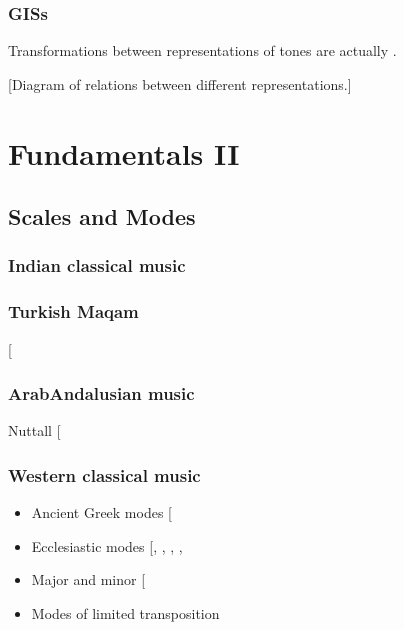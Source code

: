 \documentclass[letterpaper,10pt,english]{sphinxmanual}
\begin{document}
\subsection{GISs}
\label{\detokenize{1_fundamentals:giss}}
Transformations between representations of tones are actually .

{[}Diagram of relations between different representations.{]}


\chapter{Fundamentals II}
\label{\detokenize{1_fundamentals:fundamentals-ii}}

\section{Scales and Modes}
\label{\detokenize{1_fundamentals:scales-and-modes}}

\subsection{Indian classical music}
\label{\detokenize{1_fundamentals:indian-classical-music}}

\subsection{Turkish Maqam}
\label{\detokenize{1_fundamentals:turkish-maqam}}
 {[}\sphinxcite{8_bibliography:id22}{]}


\subsection{Arab\sphinxhyphen{}Andalusian music}
\label{\detokenize{1_fundamentals:arab-andalusian-music}}
Nuttall  {[}\sphinxcite{8_bibliography:id29}{]}


\subsection{Western classical music}
\label{\detokenize{1_fundamentals:western-classical-music}}\begin{itemize}
\item {} 
Ancient Greek modes {[}\sphinxcite{8_bibliography:id21}{]}

\item {} 
Ecclesiastic modes {[}, , , , \sphinxcite{8_bibliography:id23}{]}

\item {} 
Major and minor {[}\sphinxcite{8_bibliography:id28}{]}

\item {} 
Modes of limited transposition

\end{itemize}
\end{document}
